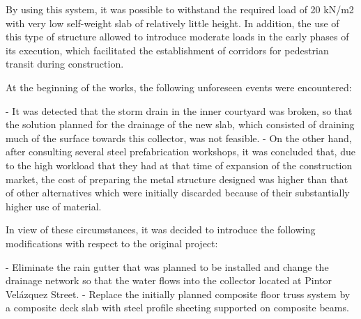 By using this system, it was possible to withstand the required load of 20 kN/m2 with very low self-weight slab of relatively little height. In addition, the use of this type of structure allowed to introduce moderate loads in the early phases of its execution, which facilitated the establishment of corridors for pedestrian transit during construction.


At the beginning of the works, the following unforeseen events were encountered:

- It was detected that the storm drain in the inner courtyard was broken, so that the solution planned for the drainage of the new slab, which consisted of draining much of the surface towards this collector, was not feasible.
- On the other hand, after consulting several steel prefabrication workshops, it was concluded that, due to the high workload that they had at that time of expansion of the construction market, the cost of preparing the metal structure designed was higher than that of other alternatives which were initially discarded because of their substantially higher use of material.

In view of these circumstances, it was decided to introduce the following modifications with respect to the original project:

- Eliminate the rain gutter that was planned to be installed and change the drainage network so that the water flows into the collector located at Pintor Velázquez Street.
- Replace the initially planned composite floor truss system by a composite deck slab with steel profile sheeting supported on composite beams.
